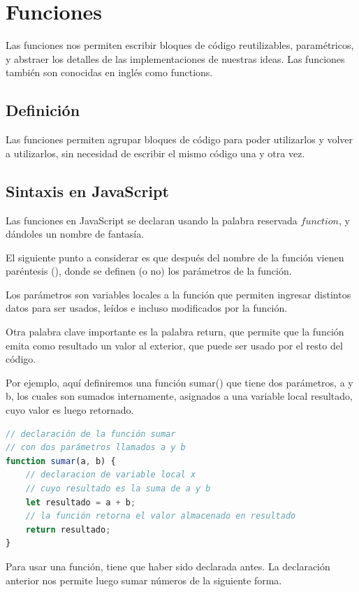 \documentclass[../principal.tex]{subfiles}
\begin{document}
\chapter{Funciones}

Las funciones nos permiten escribir bloques de código reutilizables, paramétricos, y abstraer los detalles de las implementaciones de nuestras ideas. Las funciones también son conocidas en inglés como functions.

\section{Definición}

Las funciones permiten agrupar bloques de código para poder utilizarlos y volver a utilizarlos, sin necesidad de escribir el mismo código una y otra vez.

\section{Sintaxis en JavaScript}

Las funciones en JavaScript se declaran usando la palabra reservada $function$, y dándoles un nombre de fantasía.

El siguiente punto a considerar es que después del nombre de la función vienen paréntesis (), donde se definen (o no) los parámetros de la función.

Los parámetros son variables locales a la función que permiten ingresar distintos datos para ser usados, leídos e incluso modificados por la función.

Otra palabra clave importante es la palabra return, que permite que la función emita como resultado un valor al exterior, que puede ser usado por el resto del código.

Por ejemplo, aquí definiremos una función sumar() que tiene dos parámetros, a y b, los cuales son sumados internamente, asignados a una variable local resultado, cuyo valor es luego retornado.

\begin{lstlisting}[language=JavaScript]
// declaración de la función sumar
// con dos parámetros llamados a y b
function sumar(a, b) {
    // declaracion de variable local x
    // cuyo resultado es la suma de a y b
    let resultado = a + b;
    // la función retorna el valor almacenado en resultado
    return resultado;
}
\end{lstlisting}

Para usar una función, tiene que haber sido declarada antes. La declaración anterior nos permite luego sumar números de la siguiente forma.
\end{document}
